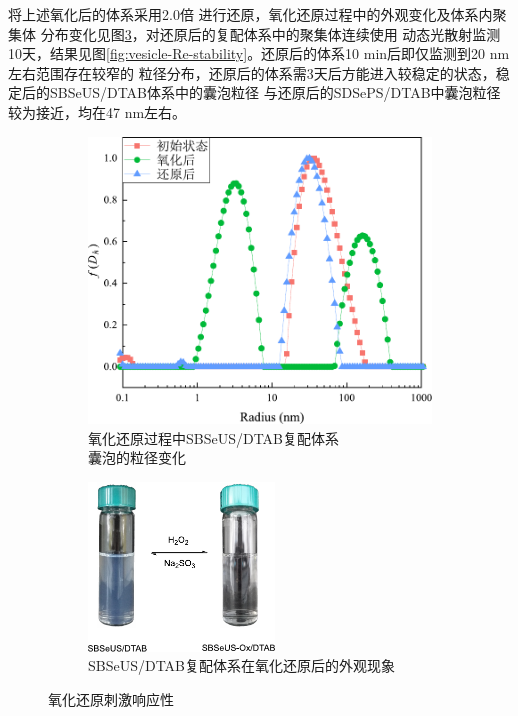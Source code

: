 \documentclass[bachelor,winfonts,replaceperiod]{jnuthesis}
\begin{document}
    将上述氧化后的体系采用2.0倍  进行还原，氧化还原过程中的外观变化及体系内聚集体
    分布变化见图\ref{fig:SBSeUS/DTAB氧化还原刺激响应性}，对还原后的复配体系中的聚集体连续使用
    动态光散射监测10天，结果见图\ref{fig:vesicle-Re-stability}。还原后的体系10 min后即仅监测到20 nm左右范围存在较窄的
    粒径分布，还原后的体系需3天后方能进入较稳定的状态，稳定后的SBSeUS/DTAB体系中的囊泡粒径
    与还原后的SDSePS/DTAB中囊泡粒径较为接近，均在47 nm左右。
    \begin{figure}[htbp]
        \begin{subfigure}[]{.5\textwidth}
            \centering
            \includegraphics[width=.8\textwidth]{figure/SBSeUS-redox-radius.pdf}
            \caption{氧化还原过程中SBSeUS/DTAB复配体系\\囊泡的粒径变化}\label{fig:SBSeUS-redox-radius}
        \end{subfigure}%
        \begin{subfigure}[]{.5\textwidth}
            \centering
            \includegraphics[height=4.5cm]{figure/scheme-SBSeUS-redox.pdf}
            \caption{SBSeUS/DTAB复配体系在氧化还原后的外观现象}\label{fig:scheme-SBSeUS-redox}
        \end{subfigure}%
        \caption{氧化还原刺激响应性}
        \label{fig:SBSeUS/DTAB氧化还原刺激响应性}
    \end{figure}
    
\end{document}
